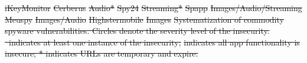 \documentclass[sigconf,balance=false]{acmart}
\newcommand{\ltgrey}{\rowcolor[gray]{0.88}} %
\newcommand{\sumanth}[1]{\textcolor{violet}{\noindent[SR: #1]}}
\newcommand{\geoff}[1]{\textcolor{purple}{\noindent[GV: #1]}}
\newcommand{\sumanth}[1]{}
\newcommand{\geoff}[1]{}
\newcommand{\rating}[1]{%
	\begin{tikzpicture}[x=1ex,y=1ex]
		\begin{scope}
			\clip (0,1) circle (1);
			\fill[lightgray] (-1,0) rectangle (1,#1/50);
		\end{scope}
		\draw[black, thin, radius=1] (0,1) circle;
	\end{tikzpicture}%
}
\providecommand{\DIFdel}[1]{{\protect\color{red}\sout{#1}}}                      %
\providecommand{\DIFdelFL}[1]{\DIFdel{#1}} %
\begin{document}
\DIFdelFL{iKeyMonitor }%
\DIFdelFL{Cerberus }%
\DIFdelFL{Audio* }%
\DIFdelFL{Spy24 }%
\DIFdelFL{Streaming* }%
\DIFdelFL{Spapp }%
\DIFdelFL{Images/Audio/Streaming }%
\DIFdelFL{Meuspy }%
\DIFdelFL{Images/Audio }%
\DIFdelFL{Highstermobile }%
\DIFdelFL{Images }%
{%
\DIFdelFL{Systematization of commodity spyware vulnerabilities. Circles denote the severity level of the insecurity. }%
\DIFdelFL{\ indicates at least one instance of the insecurity; }%
\DIFdelFL{indicates all app functionality is insecure; * indicates URLs are temporary and expire. 
	}}



\end{document}
